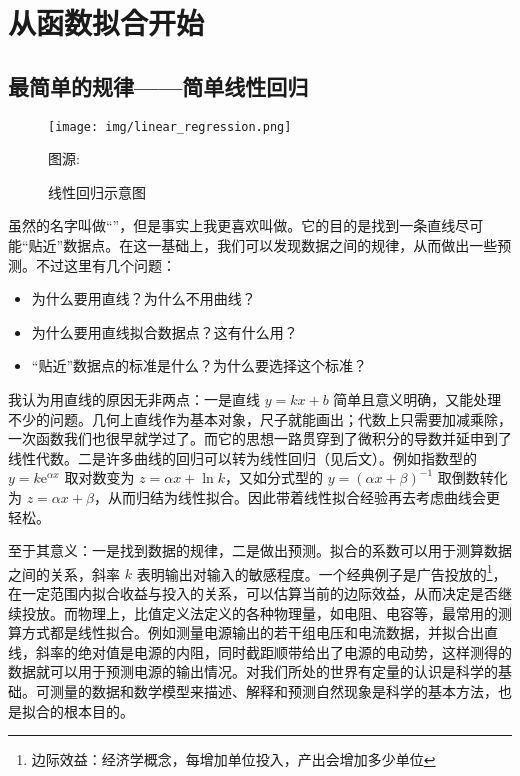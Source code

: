 \section{从函数拟合开始}
\subsection{最简单的规律——简单线性回归}

\begin{figure}[H]
    \centering
    \texttt{[image: img/linear\_regression.png]}
    \caption{线性回归示意图}
    {图源: }
    \label{fig:linear_regression}
\end{figure}

虽然的名字叫做“”，但是事实上我更喜欢叫做。它的目的是找到一条直线尽可能“贴近”数据点。在这一基础上，我们可以发现数据之间的规律，从而做出一些预测。不过这里有几个问题：
\begin{itemize}
    \item 为什么要用直线？为什么不用曲线？
    \item 为什么要用直线拟合数据点？这有什么用？
    \item “贴近”数据点的标准是什么？为什么要选择这个标准？
\end{itemize}

我认为用直线的原因无非两点：一是直线 $y = kx+b$ 简单且意义明确，又能处理不少的问题。几何上直线作为基本对象，尺子就能画出；代数上只需要加减乘除，一次函数我们也很早就学过了。而它的思想一路贯穿到了微积分的导数并延申到了线性代数。二是许多曲线的回归可以转为线性回归（见后文）。例如指数型的 $y = k \mathrm{e}^{\alpha x}$ 取对数变为 $z = \alpha x + \ln k$，又如分式型的 $y = (\alpha x + \beta)^{-1}$ 取倒数转化为 $z = \alpha x + \beta$，从而归结为线性拟合。因此带着线性拟合经验再去考虑曲线会更轻松。

至于其意义：一是找到数据的规律，二是做出预测。拟合的系数可以用于测算数据之间的关系，斜率 $k$ 表明输出对输入的敏感程度。一个经典例子是广告投放的\footnote{边际效益：经济学概念，每增加单位投入，产出会增加多少单位}，在一定范围内拟合收益与投入的关系，可以估算当前的边际效益，从而决定是否继续投放。而物理上，比值定义法定义的各种物理量，如电阻、电容等，最常用的测算方式都是线性拟合。例如测量电源输出的若干组电压和电流数据，并拟合出直线，斜率的绝对值是电源的内阻，同时截距顺带给出了电源的电动势，这样测得的数据就可以用于预测电源的输出情况。对我们所处的世界有定量的认识是科学的基础。可测量的数据和数学模型来描述、解释和预测自然现象是科学的基本方法，也是拟合的根本目的。

